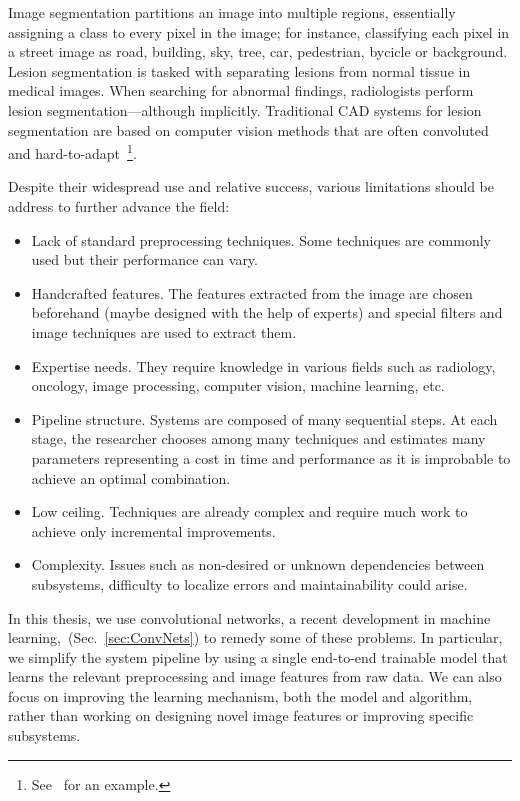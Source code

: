 Image segmentation partitions an image into multiple regions, essentially assigning a class to every pixel in the image; for instance, classifying each pixel in a street image as road, building, sky, tree, car, pedestrian, bycicle or background. Lesion segmentation is tasked with separating lesions from normal tissue in medical images. When searching for abnormal findings, radiologists perform lesion segmentation---although implicitly. Traditional CAD systems for lesion segmentation are based on computer vision methods that are often convoluted and hard-to-adapt~\footnote{See~\cite{Ashraf2013} for an example.}. 

Despite their widespread use and relative success, various limitations should be address to further advance the field:
\begin{itemize}
	\item Lack of standard preprocessing techniques. Some techniques are commonly used but their performance can vary.
	\item Handcrafted features. The features extracted from the image are chosen beforehand (maybe designed with the help of experts) and special filters and image techniques are used to extract them.
	\item Expertise needs. They require knowledge in various fields such as radiology, oncology, image processing, computer vision, machine learning, etc.
	\item Pipeline structure. Systems are composed of many sequential steps. At each stage, the researcher chooses among many techniques and estimates many parameters representing a cost in time and performance as it is improbable to achieve an optimal combination.
	\item Low ceiling. Techniques are already complex and require much work to achieve only incremental improvements.
	\item Complexity. Issues such as non-desired or unknown dependencies between subsystems, difficulty to localize errors and maintainability could arise. 
\end{itemize}

In this thesis, we use convolutional networks, a recent development in machine learning,~(Sec.~\ref{sec:ConvNets}) to remedy some of these problems. In particular, we simplify the system pipeline by using a single end-to-end trainable model that learns the relevant preprocessing and image features from raw data. We can also focus on improving the learning mechanism, both the model and algorithm, rather than working on designing novel image features or improving specific subsystems.
